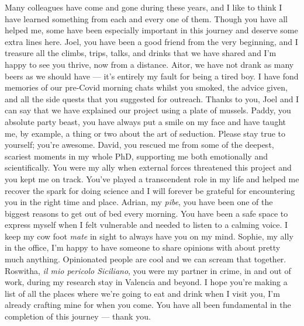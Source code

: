 Many colleagues have come and gone during these years, and I like to think I have learned something from each and every one of them. Though you have all helped me, some have been especially important in this journey and deserve some extra lines here. Joel, you have been a good friend from the very beginning, and I treasure all the climbs, trips, talks, and drinks that we have shared and I'm happy to see you thrive, now from a distance. Aitor, we have not drank as many beers as we should have --- it's entirely my fault for being a tired boy. I have fond memories of our pre-Covid morning chats whilst you smoked, the advice given, and all the side quests that you suggested for outreach. Thanks to you, Joel and I can say that we have explained our project using a plate of mussels. Paddy, you absolute party beast, you have always put a smile on my face and have taught me, by example, a thing or two about the art of seduction. Please stay true to yourself; you're awesome. David, you rescued me from some of the deepest, scariest moments in my whole PhD, supporting me both emotionally and scientifically. You were my ally when external forces threatened this project and you kept me on track. You've played a transcendent role in my life and helped me recover the spark for doing science and I will forever be grateful for encountering you in the right time and place. Adrian, my \textit{pibe}, you have been one of the biggest reasons to get out of bed every morning. You have been a safe space to express myself when I felt vulnerable and needed to listen to a calming voice. I keep my cow foot \textit{mate} in sight to always have you on my mind. Sophie, my ally in the office, I'm happy to have someone to share opinions with about pretty much anything. Opinionated people are cool and we can scream that together. Roswitha, \textit{il mio pericolo Siciliano}, you were my partner in crime, in and out of work, during my research stay in Valencia and beyond. I hope you're making a list of all the places where we're going to eat and drink when I visit you, I'm already crafting mine for when you come. You have all been fundamental in the completion of this journey --- thank you.

